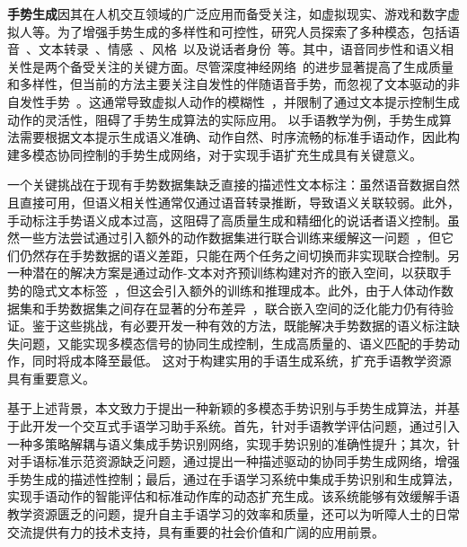 \textbf{手势生成}因其在人机交互领域的广泛应用而备受关注，如虚拟现实、游戏和数字虚拟人等。为了增强手势生成的多样性和可控性，研究人员探索了多种模态，包括语音~\cite{yang2023diffusestylegesture, yang2023unifiedgesture,xu2025mambatalk}、文本转录~\cite{zhi2023livelyspeaker, pang2023bodyformer,liu2024emage}、情感~\cite{qi2024emotiongesture, qi2024weakly}、风格~\cite{ao2023gesturediffuclip, yang2023diffusestylegesture, ghorbani2023zeroeggs}以及说话者身份~\cite{yang2023diffusestylegesture+}等。其中，语音同步性和语义相关性是两个备受关注的关键方面。尽管深度神经网络~\cite{liu2024emage, xu2025mambatalk, cheng2024siggesture}的进步显著提高了生成质量和多样性，但当前的方法主要关注自发性的伴随语音手势，而忽视了文本驱动的非自发性手势~\cite{yang2024freetalker}。这通常导致虚拟人动作的模糊性~\cite{chen2024syntalker}，并限制了通过文本提示控制生成动作的灵活性，阻碍了手势生成算法的实际应用。
以手语教学为例，手势生成算法需要根据文本提示生成语义准确、动作自然、时序流畅的标准手语动作，因此构建多模态协同控制的手势生成网络，对于实现手语扩充生成具有关键意义。

一个关键挑战在于现有手势数据集缺乏直接的描述性文本标注：虽然语音数据自然且直接可用，但语义相关性通常仅通过语音转录推断，导致语义关联较弱。此外，手动标注手势语义成本过高，这阻碍了高质量生成和精细化的说话者语义控制。虽然一些方法尝试通过引入额外的动作数据集进行联合训练来缓解这一问题~\cite{yang2024freetalker}，但它们仍然存在手势数据的语义差距，只能在两个任务之间切换而非实现联合控制。另一种潜在的解决方案是通过动作-文本对齐预训练构建对齐的嵌入空间，以获取手势的隐式文本标签~\cite{chen2024syntalker}，但这会引入额外的训练和推理成本。此外，由于人体动作数据集和手势数据集之间存在显著的分布差异~\cite{chen2024syntalker}，联合嵌入空间的泛化能力仍有待验证。鉴于这些挑战，有必要开发一种有效的方法，既能解决手势数据的语义标注缺失问题，又能实现多模态信号的协同生成控制，生成高质量的、语义匹配的手势动作，同时将成本降至最低。
这对于构建实用的手语生成系统，扩充手语教学资源具有重要意义。


基于上述背景，本文致力于提出一种新颖的多模态手势识别与手势生成算法，并基于此开发一个交互式手语学习助手系统。首先，针对手语教学评估问题，通过引入一种多策略解耦与语义集成手势识别网络，实现手势识别的准确性提升；其次，针对手语标准示范资源缺乏问题，通过提出一种描述驱动的协同手势生成网络，增强手势生成的描述性控制；最后，通过在手语学习系统中集成手势识别和生成算法，实现手语动作的智能评估和标准动作库的动态扩充生成。该系统能够有效缓解手语教学资源匮乏的问题，提升自主手语学习的效率和质量，还可以为听障人士的日常交流提供有力的技术支持，具有重要的社会价值和广阔的应用前景。



